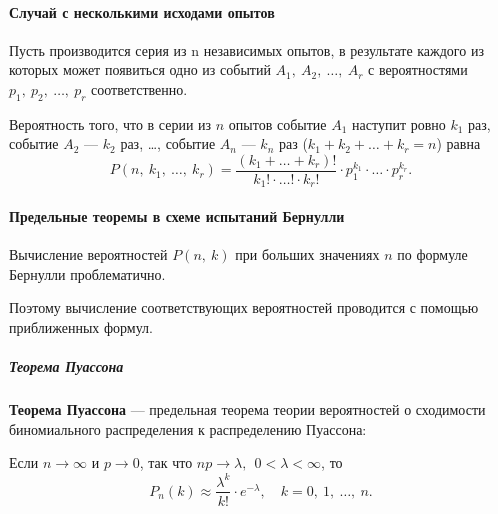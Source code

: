 \documentclass[a4paper]{article}
\newcommand{\key}[1]{{\bfseries\color{Medium} #1}}
\begin{document}
                \paragraph{Случай с несколькими исходами опытов}

                    Пусть производится серия из n независимых опытов, в результате каждого из которых может появиться одно из событий $A_1 , \: A_2 , \: \ldots , \: A_r$ с вероятностями $p_1 , \: p_2 , \: \ldots , \: p_r$ соответственно.

                    Вероятность того, что в серии из $n$ опытов событие $A_1$ наступит ровно $k_1$ раз, событие $A_2$ --- $k_2$ раз, \ldots, событие $A_n$ --- $k_n$ раз ($k_1 + k_2 + \ldots + k_r = n$) равна
                    \begin{equation*}
                        P(n, \: k_1 , \: \ldots , \: k_r) =
                            \frac{(k_1 + \ldots + k_r)!}{k_1! \cdot \ldots! \cdot k_r!} \cdot
                            p_1^{k_1} \cdot \ldots \cdot p_r^{k_r} .
                    \end{equation*}

                \paragraph{Предельные теоремы в схеме испытаний Бернулли}

                    Вычисление вероятностей $P(n, \: k)$ при больших значениях $n$ по формуле Бернулли проблематично.
                    
                    Поэтому вычисление соответствующих вероятностей проводится с помощью приближенных формул.
                    
                    \subparagraph{Теорема Пуассона}

                        \key{Теорема Пуассона} --- предельная теорема теории вероятностей о сходимости биномиального распределения к распределению Пуассона:

                        Если $n \to \infty$ и $p \to 0$, так что $n p \to \lambda, \:\: 0 < \lambda < \infty$, то
                        \begin{equation*}
                            P_n(k) \approx \frac{\lambda^k}{k!} \cdot e^{-\lambda}, \quad
                                k = 0 , \: 1 , \: \ldots , \: n .
                        \end{equation*}
\end{document}
